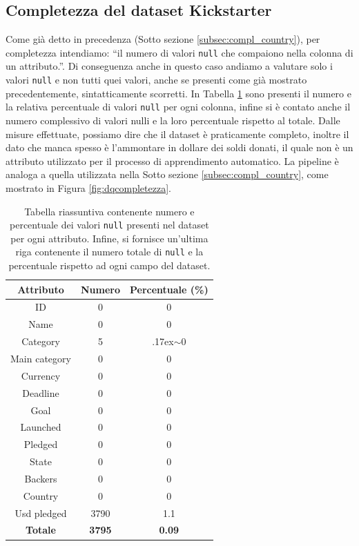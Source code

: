 \subsection{Completezza del dataset Kickstarter}
Come già detto in precedenza (Sotto sezione \ref{subsec:compl_country}), per completezza intendiamo: “il numero di valori  \texttt{null} che compaiono nella colonna di un attributo.”.
Di conseguenza anche in questo caso andiamo a valutare solo i valori \texttt{null} e non tutti quei valori, anche se presenti come già mostrato precedentemente, sintatticamente scorretti.
In Tabella \ref{tab:compl_ks} sono presenti il numero e la relativa percentuale di valori \texttt{null} per ogni colonna, infine si è contato anche il numero complessivo di valori nulli e la loro percentuale rispetto al totale.
Dalle misure effettuate, possiamo dire che il dataset è praticamente completo, inoltre il dato che manca spesso è l'ammontare in dollare dei soldi donati, il quale non è un attributo utilizzato per il processo di apprendimento automatico.
La pipeline è analoga a quella utilizzata nella Sotto sezione \ref{subsec:compl_country}, come mostrato in Figura \ref{fig:dqcompletezza}.
\begin{table}
	\caption{Tabella riassuntiva contenente numero e percentuale dei valori \texttt{null} presenti nel dataset per ogni attributo. Infine, si fornisce un'ultima riga contenente il numero totale di \texttt{null} e la percentuale rispetto ad ogni campo del dataset.}
	
	\label{tab:compl_ks}
	
	\centering
	\begin{tabular}{|c|c|c|}
		\hline
		\textbf{Attributo}  & \textbf{Numero} & \textbf{Percentuale (\%)} \\ 
		\hline  
		\rule{0pt}{13pt}ID & 0 & 0 \\ 
		\hline  
		\rule{0pt}{13pt}Name & 0  & 0 \\ 
		\hline  
		\rule{0pt}{13pt}Category & 5 & {\raise.17ex\hbox{$\scriptstyle\sim$}}0 \\ 
		\hline  
		\rule{0pt}{13pt}Main category & 0 & 0 \\ 
		\hline
		\rule{0pt}{13pt}Currency & 0 & 0 \\
		\hline
		\rule{0pt}{13pt}Deadline & 0 & 0 \\
		\hline
		\rule{0pt}{13pt}Goal & 0 & 0 \\
		\hline
		\rule{0pt}{13pt}Launched & 0 & 0 \\
		\hline
		\rule{0pt}{13pt}Pledged & 0 & 0 \\
		\hline
		\rule{0pt}{13pt}State & 0 & 0 \\
		\hline
		\rule{0pt}{13pt}Backers & 0 & 0\\
		\hline
		\rule{0pt}{13pt}Country & 0 & 0 \\
		\hline
		\rule{0pt}{13pt}Usd pledged & 3790 & 1.1 \\
		\hline
		\rule{0pt}{13pt}\textbf{Totale} & \textbf{3795} & \textbf{0.09} \\
		\hline
	\end{tabular}
\end{table}

